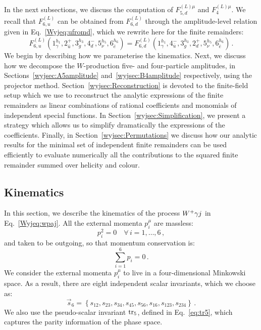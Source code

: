 \documentclass[main.tex]{subfiles}
\begin{document}
In the next subsections, we discuss the computation of $F_{5,d}^{(L)\mu}$ and $F_{4}^{(L)\mu}$. We recall that $F_{6,u}^{(L)}$ can be obtained from $F_{6,d}^{(L)}$ through the amplitude-level relation given in Eq.~\ref{Wyjeq:ufromd}, which we rewrite here for the finite remainders:
\begin{equation}  \label{Wyjeq:ufromdF}
F_{6,u}^{(L)}(1^{h_1}_\gamma,2^+_{\bar{u}},3^{h_3}_g,4^-_d,5^{h_5}_{\nu},6^{h_6}_{\bar{e}})
=
F_{6,d}^{(L)}(1^{h_1}_\gamma,4^-_{\bar{u}},3^{h_3}_g,2^+_d,5^{h_5}_{\nu},6^{h_6}_{\bar{e}}) \,.
\end{equation}
We begin by describing how we parameterise the kinematics. Next, we discuss how we decompose the $W$-production five- and four-particle amplitudes, in Sections~\ref{wyjsec:A5amplitude} and~\ref{wyjsec:B4amplitude} respectively, using the projector method. Section~\ref{wyjsec:Reconstruction} is devoted to the finite-field setup which we use to reconstruct the analytic expressions of the finite remainders as linear combinations of rational coefficients and monomials of independent special functions. In Section~\ref{wyjsec:Simplification}, we present a strategy which allows us to simplify dramatically the expressions of the coefficients. Finally, in Section~\ref{wyjsec:Permutations} we discuss how our analytic results for the minimal set of independent finite remainders can be used efficiently to evaluate numerically all the contributions to the squared finite remainder summed over helicity and colour.


\subsection{Kinematics}
\label{wyjsec:Kinematics}
In this section, we describe the kinematics of the process $W^+\gamma j$ in Eq.~\ref{Wyjeq:wpaj}.
All the external momenta $p_i^{\mu}$ are massless:
\begin{equation}
p_i^2 = 0 \quad \forall \, i = 1,\ldots,6 \,,
\end{equation}
and taken to be outgoing, so that momentum conservation is:
\begin{equation}
\sum_{i=1}^{6} p_i = 0 \,.
\end{equation}
We consider the external momenta $p_i^{\mu}$ to live in a four-dimensional Minkowski space. As a result, there are eight independent scalar invariants, which we choose as:
\begin{equation}
\vec{s}_{6} = \left\{ s_{12},s_{23},s_{34},s_{45},s_{56},s_{16},s_{123},s_{234}\right\} \,.
\label{Wyjeq:sijs6pt}
\end{equation}
We also use the pseudo-scalar invariant $\operatorname{\rm tr}_5$, defined in Eq.~\ref{eq:tr5}, which captures the parity information of the phase space. 
\end{document}
